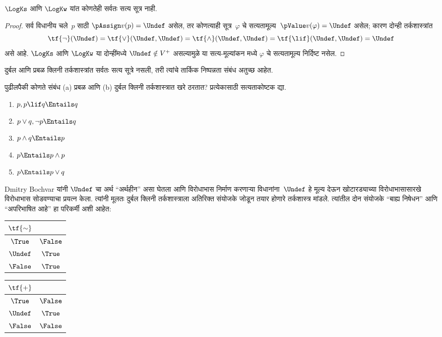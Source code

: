 \begin{prop}
  $\LogKs$ आणि $\LogKw$ यांत कोणतेही सर्वतः सत्य सूत्र नाही.
\end{prop}
\begin{proof}
  सर्व विधानीय चले~$p$ साठी
  $\pAssign v(p) = \Undef$ असेल, तर कोणत्याही
  सूत्र~$\varphi$ चे सत्यतामूल्य~$\pValue v(\varphi) =
  \Undef$ असेल; कारण दोन्ही तर्कशास्त्रांत
  \[
    \tf{\lnot}(\Undef) = \tf{\lor}(\Undef, \Undef) = \tf{\land}(\Undef,
  \Undef) = \tf{\lif}(\Undef, \Undef) = \Undef
  \]
  असे आहे. $\LogKs$ आणि $\LogKw$ या दोन्हींमध्ये
  $\Undef \notin V^+$ असल्यामुळे या सत्य-मूल्यांकन मध्ये
  $\varphi$ चे सत्यतामूल्य निर्दिष्ट नसेल.
\end{proof}

दुर्बल आणि प्रबळ क्लिनी तर्कशास्त्रांत सर्वतः सत्य सूत्रे
नसली, तरी त्यांचे तार्किक निष्पन्नता संबंध अतुच्छ आहेत.

\begin{prob}
  पुढीलपैकी कोणते संबंध (a) प्रबळ आणि (b) दुर्बल क्लिनी
  तर्कशास्त्रात खरे ठरतात? प्रत्येकासाठी सत्यताकोष्टक द्या.
  \begin{enumerate}
    \item $p, p \lif q \Entails q$
    \item $p \lor q, \lnot p \Entails q$
    \item $p \land q \Entails p$
    \item $p \Entails p \land p$
    \item $p \Entails p \lor q$
  \end{enumerate}
\end{prob}

Dmitry Bochvar यांनी $\Undef$ चा अर्थ ``अर्थहीन'' असा घेतला
आणि विरोधाभास निर्माण करणाऱ्या विधानांना~$\Undef$ हे मूल्य
देऊन खोटारड्याच्या विरोधाभासासारखे विरोधाभास सोडवण्याचा
प्रयत्न केला. त्यांनी मूलतः दुर्बल क्लिनी तर्कशास्त्राला
अतिरिक्त संयोजके जोडून तयार होणारे तर्कशास्त्र मांडले.
त्यांतील दोन संयोजके ``बाह्य निषेधन'' आणि ``अपरिभाषित
आहे'' हा परिकर्मी अशी आहेत:
\begin{center}
  \begin{tabular}{c|c}
    $\tf{\sim}$ & \\
    \hline
    $\True$ & $\False$ \\
    $\Undef$ & $\True$ \\
    $\False$ & $\True$
  \end{tabular}
\quad
  \begin{tabular}{c|c}
    $\tf{+}$ & \\
    \hline
    $\True$ & $\False$ \\
    $\Undef$ & $\True$ \\
    $\False$ & $\False$
  \end{tabular}
\end{center}

